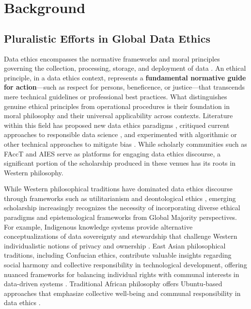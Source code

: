 \section{Background}
\label{sec:background}

\subsection{Pluralistic Efforts in Global Data Ethics}
Data ethics encompasses the normative frameworks and moral principles governing the collection, processing, storage, and deployment of data
\cite{floridi2016data}. 
An ethical principle, in a data ethics context, represents a \textbf{fundamental normative guide for action}—such as respect for persons, beneficence, or justice—that transcends mere technical guidelines or professional best practices. What distinguishes genuine ethical principles from operational procedures is their foundation in moral philosophy and their universal applicability across contexts.
Literature within this field has proposed new data ethics paradigms \cite{krijger2023ai, verhulst2021reimagining, burr2023ethical}, critiqued current approaches to responsible data science \cite{taylor2019responsible, leonelli2016locating, gansky2022counterfacctual}, and experimented with algorithmic or other technical approaches to mitigate bias \cite{hort2024bias, wang2023mitigating, smith2020mitigating}. While scholarly communities such as FAccT and AIES serve as platforms for engaging data ethics discourse, a significant portion of the scholarship produced in these venues has its roots in Western philosophy. 

While Western philosophical traditions have dominated data ethics discourse through frameworks such as utilitarianism and deontological ethics \cite{moran2022towards, heavin2024digital}, emerging scholarship increasingly recognizes the necessity of incorporating diverse ethical paradigms and epistemological frameworks from Global Majority perspectives. For example, Indigenous knowledge systems provide alternative conceptualizations of data sovereignty and stewardship that challenge Western individualistic notions of privacy and ownership \cite{carroll2023care, hudson2023indigenous, walter2021indigenous, lovett2019good, rainie2019indigenous}. East Asian philosophical traditions, including Confucian ethics, contribute valuable insights regarding social harmony and collective responsibility in technological development, offering nuanced frameworks for balancing individual rights with communal interests in data-driven systems \cite{d2023ai, ess2006ethical, yeh2010effect}. Traditional African philosophy offers Ubuntu-based approaches that emphasize collective well-being and communal responsibility in data ethics \cite{reviglio2020datafied, okyere2023place}.


